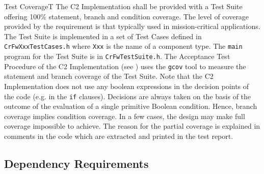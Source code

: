 \documentclass[a4paper,10pt]{article}
\newenvironment{fw_req}[6]
{\addtocounter{subsubsection}{1}
	\hspace{0.2cm}\textbf{CR-\arabic{section}.\arabic{subsection}.\arabic{subsubsection}/#2
	\hspace{0.8cm} #1}
	\vspace{-10pt}
\begin{longtable}{p{2.7cm}P{8.5cm}}
\hline
\textsc{Requirement} & #3 \\
\textsc{Justification} & #4 \\
\textsc{Implementation} & #5  \\ 
\textsc{Verification} & #6  \\
\hline
}
{\end{longtable}}
\begin{document}
\begin{fw_req}{Test Coverage}{T}
{The C2 Implementation shall be provided with a Test Suite offering 100\% statement, branch and condition coverage.}
{The level of coverage provided by the requirement is that typically used in mission-critical applications.}
{The Test Suite is implemented in a set of Test Cases defined in \texttt{CrFwXxxTestCases.h} where \texttt{Xxx} is the name of a component type. The \texttt{main} program for the Test Suite is in \texttt{CrFwTestSuite.h}.} 
{The Acceptance Test Procedure of the C2 Implementation (see \cite{ref:C2Implementation}) uses the \texttt{gcov} tool to measure the statement and branch coverage of the Test Suite. Note that the C2 Implementation does not use any boolean expressions in the decision 
points of the code (e.g. in the \texttt{if} clauses). Decisions are always taken on the basis of the outcome of the evaluation of a single primitive Boolean condition. Hence, branch coverage implies condition coverage. In a few cases, the design may make full coverage impossible to achieve. The reason for the partial coverage is explained in comments in the code which are extracted and printed in the test report.}
\end{fw_req}





\subsection{Dependency Requirements}\label{req:dependencyReqs}
\end{document}
